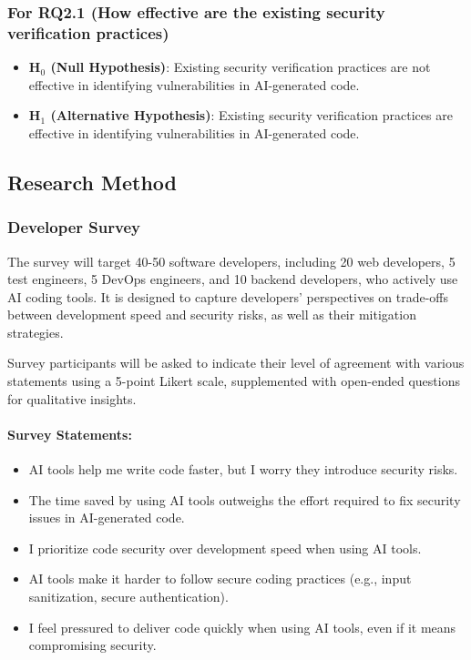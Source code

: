 \subsubsection{For RQ2.1 (How effective are the existing security verification practices)}

\begin{itemize}
    \item \textbf{H$_{0}$ (Null Hypothesis)}: Existing security verification practices are not effective in identifying vulnerabilities in AI-generated code.
    \item \textbf{H$_{1}$ (Alternative Hypothesis)}: Existing security verification practices are effective in identifying vulnerabilities in AI-generated code.
\end{itemize}

\subsection{Research Method}

\subsubsection{Developer Survey}

The survey will target 40-50 software developers, including 20 web developers, 5 test engineers, 5 DevOps engineers, and 10 backend developers, who actively use AI coding tools. It is designed to capture developers' perspectives on trade-offs between development speed and security risks, as well as their mitigation strategies.

Survey participants will be asked to indicate their level of agreement with various statements using a 5-point Likert scale, supplemented with open-ended questions for qualitative insights.

\paragraph{Survey Statements:}
\begin{itemize}
    \item AI tools help me write code faster, but I worry they introduce security risks.
    \item The time saved by using AI tools outweighs the effort required to fix security issues in AI-generated code.
    \item I prioritize code security over development speed when using AI tools.
    \item AI tools make it harder to follow secure coding practices (e.g., input sanitization, secure authentication).
    \item I feel pressured to deliver code quickly when using AI tools, even if it means compromising security.
\end{itemize}

